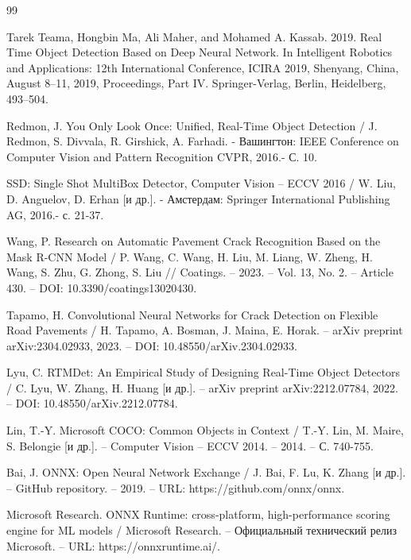 \documentclass[a4paper,12pt]{article}
\begin{document}
\renewcommand{\bibname}{Список литературы}
\begin{thebibliography}{99}
\vspace{5mm}

Tarek Teama, Hongbin Ma, Ali Maher, and Mohamed A. Kassab. 2019. Real Time Object Detection Based on Deep Neural Network. In Intelligent Robotics and Applications: 12th International Conference, ICIRA 2019, Shenyang, China, August 8–11, 2019, Proceedings, Part IV. Springer-Verlag, Berlin, Heidelberg, 493–504.

Redmon, J. You Only Look Once: Unified, Real-Time Object Detection / J. Redmon, S. Divvala, R. Girshick, A. Farhadi. - Вашингтон: IEEE Conference on Computer Vision and Pattern Recognition CVPR, 2016.- С. 10.

SSD: Single Shot MultiBox Detector, Computer Vision – ECCV 2016 / W. Liu, D. Anguelov, D. Erhan [и др.]. - Амстердам: Springer International Publishing AG, 2016.- с. 21-37.

Wang, P. Research on Automatic Pavement Crack Recognition Based on the Mask R-CNN Model / P. Wang, C. Wang, H. Liu, M. Liang, W. Zheng, H. Wang, S. Zhu, G. Zhong, S. Liu // Coatings. – 2023. – Vol. 13, No. 2. – Article 430. – DOI: 10.3390/coatings13020430.

Tapamo, H. Convolutional Neural Networks for Crack Detection on Flexible Road Pavements / H. Tapamo, A. Bosman, J. Maina, E. Horak. – arXiv preprint arXiv:2304.02933, 2023. – DOI: 10.48550/arXiv.2304.02933.

Lyu, C. RTMDet: An Empirical Study of Designing Real-Time Object Detectors / C. Lyu, W. Zhang, H. Huang [и др.]. – arXiv preprint arXiv:2212.07784, 2022. – DOI: 10.48550/arXiv.2212.07784.

Lin, T.-Y. Microsoft COCO: Common Objects in Context / T.-Y. Lin, M. Maire, S. Belongie [и др.]. – Computer Vision – ECCV 2014. – 2014. – С. 740-755.

Bai, J. ONNX: Open Neural Network Exchange / J. Bai, F. Lu, K. Zhang [и др.]. – GitHub repository. – 2019. – URL: https://github.com/onnx/onnx.

Microsoft Research. ONNX Runtime: cross-platform, high-performance scoring engine for ML models / Microsoft Research. – Официальный технический релиз Microsoft. – URL: https://onnxruntime.ai/.

\end{thebibliography}
\end{document}

